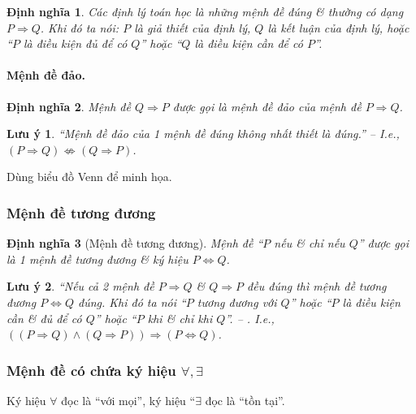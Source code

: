 \documentclass{article}
\numberwithin{equation}{section}
\newtheorem{definition}{Định nghĩa}[section]
\newtheorem{remark}{Lưu ý}[section]
\begin{document}
\begin{definition}
	Các định lý toán học là những mệnh đề đúng \& thường có dạng $P\Rightarrow Q$. Khi đó ta nói: $P$ là \emph{giả thiết} của định lý, $Q$ là \emph{kết luận} của định lý, hoặc ``$P$ là \emph{điều kiện đủ} để có $Q$'' hoặc ``$Q$ là \emph{điều kiện cần} để có $P$''.
\end{definition}

\paragraph{Mệnh đề đảo.}
\begin{definition}
	Mệnh đề $Q\Rightarrow P$ được gọi là \emph{mệnh đề đảo} của mệnh đề $P\Rightarrow Q$.
\end{definition}

\begin{remark}
	``Mệnh đề đảo của 1 mệnh đề đúng không nhất thiết là đúng.'' -- \cite[p. 9]{Khoai_Anh_Tan_Thang_Anh_Cuong_Duong_Dang_Ha_Hanh_Hong_Son_Tuan_Vuong_Toan_10_tap_1} I.e., $(P\Rightarrow Q)\not\Leftrightarrow(Q\Rightarrow P)$.
\end{remark}
Dùng biểu đồ Venn để minh họa.

\subsubsection{Mệnh đề tương đương}

\begin{definition}[Mệnh đề tương đương]
	Mệnh đề ``$P$ nếu \& chỉ nếu $Q$'' được gọi là 1 \emph{mệnh đề tương đương} \& ký hiệu $P\Leftrightarrow Q$.
\end{definition}

\begin{remark}
	``Nếu cả 2 mệnh đề $P\Rightarrow Q$ \& $Q\Rightarrow P$ đều đúng thì mệnh đề tương đương $P\Leftrightarrow Q$ đúng. Khi đó ta nói ``$P$ \emph{tương đương} với $Q$'' hoặc ``$P$ là \emph{điều kiện cần \& đủ} để có $Q$'' hoặc ``$P$ khi \& chỉ khi $Q$''. -- \cite[p. 9]{Khoai_Anh_Tan_Thang_Anh_Cuong_Duong_Dang_Ha_Hanh_Hong_Son_Tuan_Vuong_Toan_10_tap_1}. I.e., $((P\Rightarrow Q)\land(Q\Rightarrow P))\Rightarrow(P\Leftrightarrow Q)$.
\end{remark}

\subsubsection{Mệnh đề có chứa ký hiệu $\forall,\exists$}
Ký hiệu $\forall$ đọc là ``với mọi'', ký hiệu ``$\exists$ đọc là ``tồn tại''.
\end{document}
